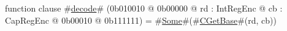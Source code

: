 function clause #\hyperref[sailMIPSzdecode]{decode}# (0b010010 @ 0b00000 @ rd : IntRegEnc @ cb : CapRegEnc @    0b00010 @ 0b111111) = #\hyperref[sailMIPSzSome]{Some}#(#\hyperref[sailMIPSzCGetBase]{CGetBase}#(rd, cb))
